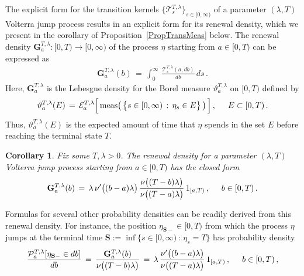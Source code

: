 \documentclass[10pt]{article}
\numberwithin{equation}{section}
\newtheorem{corollary}[theorem]{Corollary}
\theoremstyle{definition}
\begin{document}
The explicit form for the transition kernels  $\{ \mathscr{T}^{T,\lambda}_s\}_{s\in [0,\infty)}   $  of a parameter $(\lambda,T)$ Volterra jump process results in  an explicit form for its renewal density, which we present in the corollary of Proposition~\ref{PropTransMeas} below.  The renewal density  $\mathbf{G}^{T,\lambda}_a:[0,T)\rightarrow [0,\infty)$ of the process $\eta$ starting from $a\in [0,T)$ can be expressed as
\begin{align*}
\mathbf{G}^{T,\lambda}_a(b)\,=\, \int_0^{\infty}\, \frac{\mathscr{T}^{T,\lambda}_{s}(a,db)}{ db }\,ds \,.
\end{align*}
Here, $\mathbf{G}^{T,\lambda}_a$ is the Lebesgue density for the Borel measure $\vartheta^{T,\lambda}_a $ on $ [0,T) $ defined by
\begin{align}\label{RenewalMeasure}
\vartheta^{T,\lambda}_a(E)\,=\,\mathcal{E}_a^{T,\lambda}\Big[\, \textup{meas}\big(\,\big\{s\in [0,\infty)\,:\,  \eta_s\in E  \big\} \,\big) \, \Big] \,,  \hspace{.5cm} E\subset [0,T)      \,.
\end{align}
Thus, $\vartheta^{T,\lambda}_a(E)$ is the expected amount of time that $ \eta$ spends in the set $E$ before reaching the terminal state $T$.
\begin{corollary}\label{CorRenewalForm} Fix some $T,\lambda>0$. The renewal density for a parameter $(\lambda,T)$ Volterra jump process  starting from  $a\in [0,T)$ has the closed form 
\begin{align*}
\mathbf{G}^{T,\lambda}_a(b)\,=\, \lambda \, \nu'\big((b-a)\lambda \big)\,\frac{ \nu\big((T-b) \lambda\big)}{ \nu\big((T-a) \lambda \big)}\,1_{[a,T)} \,, \hspace{.5cm}b\in [0,T)\,.
\end{align*}
\end{corollary}
Formulas for several other probability densities can be readily derived from this renewal density. For instance, the  position $\eta_{ \mathbf{S}-}\in [0,T)$ from which the process $\eta$ jumps at the terminal time $\mathbf{S}:=\inf\big\{s\in [0,\infty)\,:\, \eta_s=T  \big\}$  has probability density
\begin{align*}
\frac{\mathcal{P}_a^{T,\lambda}[ \eta_{ \mathbf{S}-} \in d b  ]}{d b }\,=\,  \frac{\mathbf{G}^{T,\lambda}_a(b)}{ \nu\big((T-b)  \lambda \big)}  \,=\,\lambda \,\frac{  \nu'\big((b-a) \lambda\big) }{\nu\big((T-a) \lambda \big)   } \,1_{[a,T)} \,, \hspace{.5cm}b\in [0,T) \,,
\end{align*}
\end{document}
